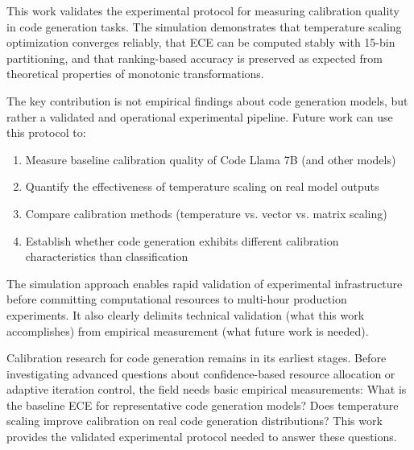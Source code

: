 
This work validates the experimental protocol for measuring calibration quality in code generation tasks. The simulation demonstrates that temperature scaling optimization converges reliably, that ECE can be computed stably with 15-bin partitioning, and that ranking-based accuracy is preserved as expected from theoretical properties of monotonic transformations.

The key contribution is not empirical findings about code generation models, but rather a validated and operational experimental pipeline. Future work can use this protocol to:
\begin{enumerate}
\item Measure baseline calibration quality of Code Llama 7B (and other models)
\item Quantify the effectiveness of temperature scaling on real model outputs
\item Compare calibration methods (temperature vs. vector vs. matrix scaling)
\item Establish whether code generation exhibits different calibration characteristics than classification
\end{enumerate}

The simulation approach enables rapid validation of experimental infrastructure before committing computational resources to multi-hour production experiments. It also clearly delimits technical validation (what this work accomplishes) from empirical measurement (what future work is needed).

Calibration research for code generation remains in its earliest stages. Before investigating advanced questions about confidence-based resource allocation or adaptive iteration control, the field needs basic empirical measurements: What is the baseline ECE for representative code generation models? Does temperature scaling improve calibration on real code generation distributions? This work provides the validated experimental protocol needed to answer these questions.
